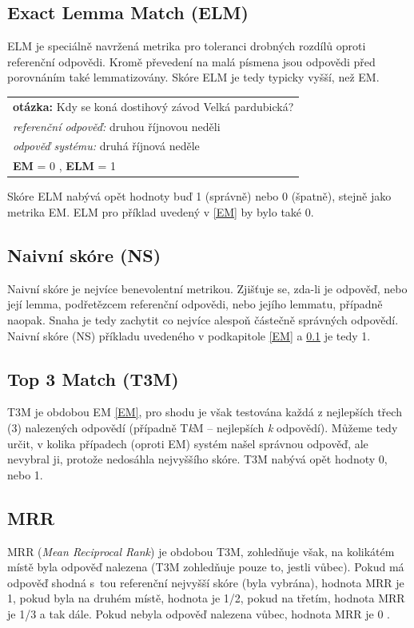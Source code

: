 \subsection{Exact Lemma Match (ELM)}
\label{ELM}
ELM je speciálně navržená metrika pro toleranci drobných rozdílů oproti referenční odpovědi. Kromě převedení na malá písmena jsou odpovědi před porovnáním také lemmatizovány. Skóre ELM je tedy typicky vyšší, než EM.
\begin{center}
\begin{tabular}{l}
    \textbf{otázka:} Kdy se koná dostihový závod Velká pardubická?\\
    \emph{referenční odpověď:} druhou říjnovou neděli\\
    \emph{odpověď systému:} druhá říjnová neděle \\
    \textbf{EM} = 0 , \textbf{ELM} = 1\\
\end{tabular}
\end{center}

Skóre ELM nabývá opět hodnoty buď 1 (správně) nebo 0 (špatně), stejně jako metrika EM. ELM pro příklad uvedený v \ref{EM} by bylo také 0.

\subsection{Naivní skóre (NS)}
Naivní skóre je nejvíce benevolentní metrikou. Zjišťuje se, zda-li je odpověď, nebo její lemma, podřetězcem referenční odpovědi, nebo jejího lemmatu, případně naopak. Snaha je tedy zachytit co nejvíce alespoň částečně správných odpovědí. Naivní skóre (NS) příkladu uvedeného v podkapitole \ref{EM} a \ref{ELM} je tedy 1. 

\subsection{Top 3 Match (T3M)}
T3M je obdobou EM \ref{EM}, pro shodu je však testována každá z nejlepších třech (3) nalezených odpovědí (případně T\textit{k}M -- nejlepších \textit{k} odpovědí). Můžeme tedy určit, v kolika případech (oproti EM) systém našel správnou odpověď, ale nevybral ji, protože nedosáhla nejvyššího skóre. T3M nabývá opět hodnoty 0, nebo 1.

\subsection{MRR}
MRR (\emph{Mean Reciprocal Rank}) je obdobou T3M, zohledňuje však, na kolikátém místě byla odpověď nalezena (T3M zohledňuje pouze to, jestli vůbec). Pokud má odpověď shodná s~tou referenční nejvyšší skóre (byla vybrána), hodnota MRR je 1, pokud byla na druhém místě, hodnota je 1/2, pokud na třetím, hodnota MRR je 1/3 a tak dále. Pokud nebyla odpověď nalezena vůbec, hodnota MRR je 0 \cite{MRR}.

